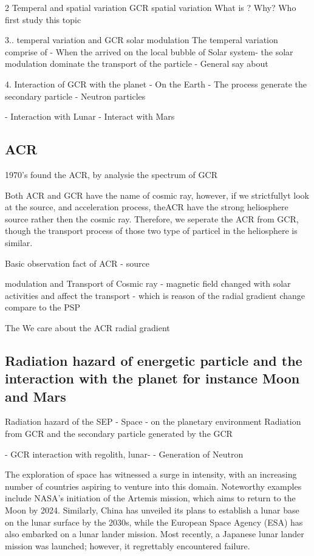 \begin{figure}
	\centering
	
	
\end{figure}
	
2 Temperal and spatial variation
	GCR spatial variation
		What is ?
		Why?
		Who first study this topic 
	

3..  temperal variation and GCR solar modulation 
	 The temperal variation comprise of 
	- When the arrived on the local bubble of Solar system- the solar modulation dominate the transport of the particle - General say about 

4.  Interaction of GCR with the planet
	- On the Earth 
		- The process generate the secondary particle
		- Neutron particles	
		
		
	- Interaction with Lunar
	- Interact with Mars 

   


\subsection{ACR}
 1970's found the ACR, by analysie the spectrum of GCR


Both ACR and GCR have the name of cosmic ray, however, if we strictfullyt look at the source, and acceleration process, theACR have the strong heliosphere source rather then the cosmic ray.
Therefore, we seperate the ACR from GCR, though the transport process of those two type of particel in the heliosphere is similar.

Basic observation fact of ACR
- source 

modulation and Transport of Cosmic ray - magnetic field changed with solar activities and affect the transport -  which is reason of the radial gradient change compare to the PSP 

The 
We care about the ACR radial gradient



\subsection{Radiation hazard of energetic particle and the interaction with the planet for instance Moon and Mars}

Radiation hazard of the SEP 
- Space
- on the planetary environment
Radiation from GCR and the secondary particle generated by the GCR

- GCR interaction with regolith, lunar-
	- Generation of Neutron

The exploration of space has witnessed a surge in intensity, with an increasing number of countries aspiring to venture into this domain. Noteworthy examples include NASA's initiation of the Artemis mission, which aims to return to the Moon by 2024. Similarly, China has unveiled its plans to establish a lunar base on the lunar surface by the 2030s, while the European Space Agency (ESA) has also embarked on a lunar lander mission. Most recently, a Japanese lunar lander mission was launched; however, it regrettably encountered failure.

